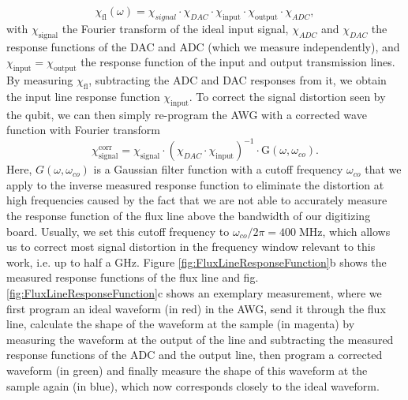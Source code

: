 %
\begin{equation}
\chi_{\mathrm{fl}}(\omega) = \chi_{signal}\cdot \chi_{DAC}\cdot \chi_{\mathrm{input}}\cdot\chi_{\mathrm{output}}\cdot\chi_{ADC}, \label{eq:flux_response}
\end{equation}
%
with $\chi_{\mathrm{signal}}$ the Fourier transform of the ideal input signal, $\chi_{ADC}$ and $\chi_{DAC}$ the response functions of the DAC and ADC (which we measure independently), and $\chi_{\mathrm{input}}=\chi_{\mathrm{output}}$ the response function of the input and output transmission lines. By measuring $\chi_{\mathrm{fl}}$, subtracting the ADC and DAC responses from it, we obtain the input line response function $\chi_{\mathrm{input}}$. To correct the signal distortion seen by the qubit, we can then simply re-program the AWG with a corrected wave function with Fourier transform 
%
\begin{equation}
\chi_{\mathrm{signal}}^{\mathrm{corr}} = \chi_{\mathrm{signal}}\cdot (\chi_{DAC}\cdot\chi_{\mathrm{input}})^{-1}\cdot \mathrm{G}(\omega,\omega_{co}).
\end{equation}
%
Here, $G(\omega,\omega_{co})$ is a Gaussian filter function with a cutoff frequency $\omega_{co}$ that we apply to the inverse measured response function to eliminate the distortion at high frequencies caused by the fact that we are not able to accurately measure the response function of the flux line above the bandwidth of our digitizing board. Usually, we set this cutoff frequency to $\omega_{co}/2\pi=400\;\mathrm{MHz}$, which allows us to correct most signal distortion in the frequency window relevant to this work, i.e. up to half a GHz. Figure \ref{fig:FluxLineResponseFunction}b shows the measured response functions of the flux line and fig. \ref{fig:FluxLineResponseFunction}c shows an exemplary measurement, where we first program an ideal waveform (in red) in the AWG, send it through the flux line, calculate the shape of the waveform at the sample (in magenta) by measuring the waveform at the output of the line and subtracting the measured response functions of the ADC and the output line, then program a corrected waveform (in green) and finally measure the shape of this waveform at the sample again (in blue), which now corresponds closely to the ideal waveform.
 


\smallskip

